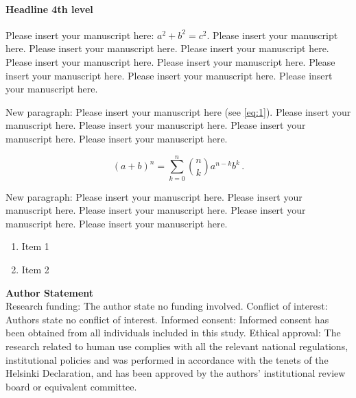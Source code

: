 \documentclass[USenglish,twocolumn]{article}
\begin{document}
  \paragraph{Headline 4th level}
  Please insert your manuscript here: $a^2+b^2=c^2$. Please insert your manuscript here. Please insert your manuscript here. Please insert your manuscript here. Please insert your manuscript here. Please insert your manuscript here. Please insert your manuscript here. Please insert your manuscript here. Please insert your manuscript here.

  New paragraph: Please insert your manuscript here (see \ref{eq:1}). Please insert your manuscript here. Please insert your manuscript here. Please insert your manuscript here. Please insert your manuscript here.

  \begin{equation}
    (a+b)^n=\sum_{k=0}^n \binom{n}{k}a^{n-k}b^k\,.
    \label{eq:1}
  \end{equation}

  New paragraph: Please insert your manuscript here. Please insert your manuscript here. Please insert your manuscript here. Please insert your manuscript here. Please insert your manuscript here.

  \begin{enumerate}
    \item Item 1
    \item Item 2
  \end{enumerate}


  \textsf{\textbf{Author Statement}}\\
  Research funding: The author state no funding involved. Conflict of interest: Authors state no conflict of interest. Informed consent: Informed consent has been obtained from all individuals included in this study. Ethical approval: The research related to human use complies with all the relevant national regulations, institutional policies and was performed in accordance with the tenets of the Helsinki Declaration, and has been approved by the authors' institutional review board or equivalent committee.

\end{document}
